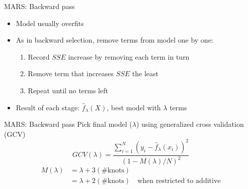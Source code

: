 \documentclass{beamer}
\begin{document}
\begin{frame}{MARS: Backward pass}
  \begin{itemize}[<+->]
    \item Model usually overfits
    \item As in backward selection, remove terms from model one by one:
    \begin{enumerate}
      \item Record $SSE$ increase by removing each term in turn
      \item Remove term that increases $SSE$ the least
      \item Repeat until no terms left
    \end{enumerate}
    \item Result of each stage: $\hat{f}_{\lambda}(X)$, best model with $\lambda$ terms
  \end{itemize}

\end{frame}

\begin{frame}{MARS: Backward pass}
Pick final model ($\lambda$) using generalized cross validation (GCV) 
    \pause
    \begin{equation*}
    GCV(\lambda) =
      \frac{
        \sum_{i = 1}^{N}(y_{i} - \hat{f}_{\lambda}(x_{i}))^2
      }{
        (1 - M(\lambda)/N)^2
      }
  \end{equation*}
  \begin{align*}
    M(\lambda) &= \lambda + 3(\text{\# knots}) \\
     &=\lambda + 2(\text{\# knots}) \quad \text{when restricted to additive}
  \end{align*}
\end{frame}

\end{document}
